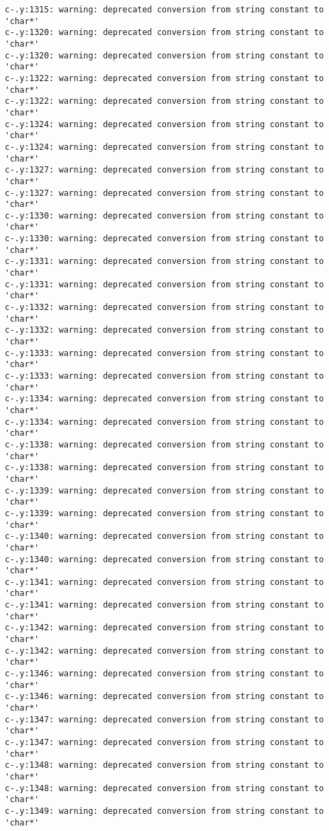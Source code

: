 \documentclass[12pt]{book}
\begin{document}
\begin{lstlisting}
c-.y:1315: warning: deprecated conversion from string constant to 'char*'
c-.y:1320: warning: deprecated conversion from string constant to 'char*'
c-.y:1320: warning: deprecated conversion from string constant to 'char*'
c-.y:1322: warning: deprecated conversion from string constant to 'char*'
c-.y:1322: warning: deprecated conversion from string constant to 'char*'
c-.y:1324: warning: deprecated conversion from string constant to 'char*'
c-.y:1324: warning: deprecated conversion from string constant to 'char*'
c-.y:1327: warning: deprecated conversion from string constant to 'char*'
c-.y:1327: warning: deprecated conversion from string constant to 'char*'
c-.y:1330: warning: deprecated conversion from string constant to 'char*'
c-.y:1330: warning: deprecated conversion from string constant to 'char*'
c-.y:1331: warning: deprecated conversion from string constant to 'char*'
c-.y:1331: warning: deprecated conversion from string constant to 'char*'
c-.y:1332: warning: deprecated conversion from string constant to 'char*'
c-.y:1332: warning: deprecated conversion from string constant to 'char*'
c-.y:1333: warning: deprecated conversion from string constant to 'char*'
c-.y:1333: warning: deprecated conversion from string constant to 'char*'
c-.y:1334: warning: deprecated conversion from string constant to 'char*'
c-.y:1334: warning: deprecated conversion from string constant to 'char*'
c-.y:1338: warning: deprecated conversion from string constant to 'char*'
c-.y:1338: warning: deprecated conversion from string constant to 'char*'
c-.y:1339: warning: deprecated conversion from string constant to 'char*'
c-.y:1339: warning: deprecated conversion from string constant to 'char*'
c-.y:1340: warning: deprecated conversion from string constant to 'char*'
c-.y:1340: warning: deprecated conversion from string constant to 'char*'
c-.y:1341: warning: deprecated conversion from string constant to 'char*'
c-.y:1341: warning: deprecated conversion from string constant to 'char*'
c-.y:1342: warning: deprecated conversion from string constant to 'char*'
c-.y:1342: warning: deprecated conversion from string constant to 'char*'
c-.y:1346: warning: deprecated conversion from string constant to 'char*'
c-.y:1346: warning: deprecated conversion from string constant to 'char*'
c-.y:1347: warning: deprecated conversion from string constant to 'char*'
c-.y:1347: warning: deprecated conversion from string constant to 'char*'
c-.y:1348: warning: deprecated conversion from string constant to 'char*'
c-.y:1348: warning: deprecated conversion from string constant to 'char*'
c-.y:1349: warning: deprecated conversion from string constant to 'char*'

\end{lstlisting}
\end{document}
